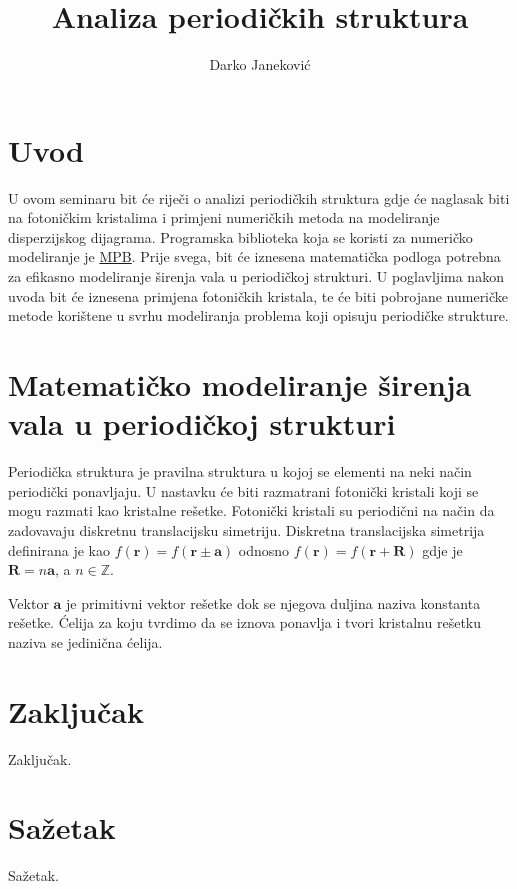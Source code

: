 \documentclass[utf8, seminar]{fer}
\begin{document}
\title{Analiza periodičkih struktura}
\author{Darko Janeković}

\maketitle

\tableofcontents

\chapter{Uvod}
U ovom seminaru bit će riječi o analizi periodičkih struktura gdje će naglasak
biti na fotoničkim kristalima i primjeni numeričkih metoda na modeliranje
disperzijskog dijagrama. Programska biblioteka koja se koristi za numeričko
modeliranje je \href{https://github.com/stevengj/mpb}{MPB}. Prije svega, bit će
iznesena matematička podloga potrebna za efikasno modeliranje širenja vala u
periodičkoj strukturi. U poglavljima nakon uvoda bit će iznesena primjena
fotoničkih kristala, te će biti pobrojane numeričke metode korištene u svrhu
modeliranja problema koji opisuju periodičke strukture.

\chapter{Matematičko modeliranje širenja vala u periodičkoj strukturi}

Periodička struktura je pravilna struktura u kojoj se elementi na neki način
periodički ponavljaju. U nastavku će biti razmatrani fotonički kristali koji se
mogu razmati kao kristalne rešetke. Fotonički kristali su periodični na način
da zadovavaju diskretnu translacijsku simetriju. Diskretna translacijska
simetrija definirana je kao ${f(\mathbf{r}) = f(\mathbf{r} \pm \mathbf{a})}$
odnosno ${f(\mathbf{r}) = f(\mathbf{r} + \mathbf{R})}$ gdje je ${\mathbf{R} =
n\mathbf{a}}$, a $n \in \mathbb{Z}$.

Vektor $\mathbf{a}$ je primitivni vektor rešetke dok se njegova duljina naziva
konstanta rešetke. Ćelija za koju tvrdimo da se iznova ponavlja i tvori
kristalnu rešetku naziva se jedinična ćelija.



\chapter{Zaključak}
Zaključak.




\chapter{Sažetak}
Sažetak.
\end{document}
